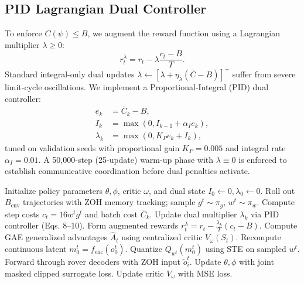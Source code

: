 \documentclass[10pt,twocolumn,letterpaper]{article}
\begin{document}
\subsection{PID Lagrangian Dual Controller}
To enforce $C(\psi) \le B$, we augment the reward function using a Lagrangian multiplier $\lambda \ge 0$:
\begin{equation}
    r_t^\lambda = r_t - \lambda \frac{c_t - B}{T}.
\end{equation}
Standard integral-only dual updates $\lambda \leftarrow [\lambda + \eta_\lambda (\bar{C} - B)]^+$ suffer from severe limit-cycle oscillations. We implement a Proportional-Integral (PID) dual controller:
\begin{align}
    e_k &= \bar{C}_k - B, \\
    I_k &= \max(0, I_{k-1} + \alpha_I e_k), \\
    \lambda_k &= \max(0, K_P e_k + I_k),
\end{align}
tuned on validation seeds with proportional gain $K_P = 0.005$ and integral rate $\alpha_I = 0.01$. A 50,000-step (25-update) warm-up phase with $\lambda \equiv 0$ is enforced to establish communicative coordination before dual penalties activate.

\begin{algorithm}[tb]
\caption{Primal-Dual MAPPO with ZOH Memory and Adaptive Precision}
\label{alg:mappo}
\begin{algorithmic}[1]
\STATE Initialize policy parameters $\theta, \phi$, critic $\omega$, and dual state $I_0 \leftarrow 0, \lambda_0 \leftarrow 0$.
    \STATE Roll out $B_{\mathrm{env}}$ trajectories with ZOH memory tracking; sample $g^t \sim \pi_g$, $w^t \sim \pi_w$.
    \STATE Compute step costs $c_t = 16 w^t g^t$ and batch cost $\bar{C}_k$.
    \STATE Update dual multiplier $\lambda_k$ via PID controller (Eqs. 8--10).
    \STATE Form augmented rewards $r_t^\lambda = r_t - \frac{\lambda_k}{T}(c_t - B)$.
    \STATE Compute GAE generalized advantages $\hat{A}_t$ using centralized critic $V_\omega(S_t)$.
            \STATE Recompute continuous latent $m_0^t = f_{\mathrm{enc}}(o_0^t)$.
            \STATE Quantize $Q_{w^t}(m_0^t)$ using STE on sampled $w^t$.
            \STATE Forward through rover decoders with ZOH input $\tilde{o}_i^t$.
            \STATE Update $\theta, \phi$ with joint masked clipped surrogate loss.
            \STATE Update critic $V_\omega$ with MSE loss.
        \ENDFOR
    \ENDFOR
\ENDFOR
\end{algorithmic}
\end{algorithm}
\end{document}
